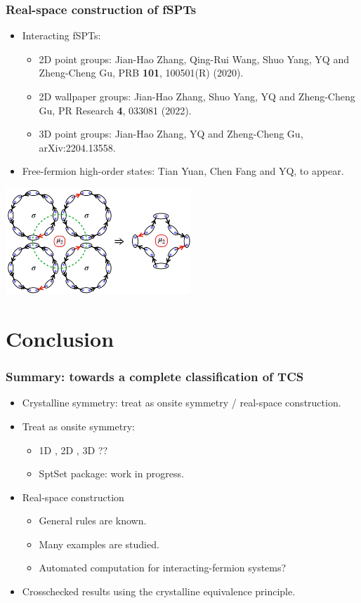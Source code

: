 \documentclass[xcolor=table, 11pt, aspectratio=169]{beamer}
\begin{document}
\begin{frame}
  \frametitle{Real-space construction of fSPTs}

  \begin{itemize}
  \item Interacting fSPTs:
    \begin{itemize}
    \item 2D point groups: Jian-Hao Zhang, Qing-Rui Wang, Shuo Yang, YQ and Zheng-Cheng Gu,
      PRB \textbf{101}, 100501(R) (2020).
    \item 2D wallpaper groups: Jian-Hao Zhang, Shuo Yang, YQ and Zheng-Cheng Gu,
      PR Research \textbf{4}, 033081 (2022).
    \item 3D point groups: Jian-Hao Zhang, YQ and Zheng-Cheng Gu, arXiv:2204.13558.
    \end{itemize}
  \item Free-fermion high-order states:
    Tian Yuan, Chen Fang and YQ, to appear.
  \end{itemize}
  \begin{center}
    \includegraphics[height=4cm]{majorana_bubble}    
  \end{center}
\end{frame}

\section{Conclusion}

\begin{frame}
\frametitle{Summary: towards a complete classification of TCS}
\begin{itemize}
\item Crystalline symmetry: treat as onsite symmetry / real-space construction.
\item Treat as onsite symmetry:
  \begin{itemize}
  \item 1D , 2D , 3D ??
  \item SptSet package: work in progress.
  \end{itemize}
\item Real-space construction
  \begin{itemize}
  \item General rules are known.
  \item Many examples are studied.
  \item Automated computation for interacting-fermion systems?
  \end{itemize}
\item Crosschecked results using the crystalline equivalence principle.
\end{itemize}
\end{frame}
\end{document}
